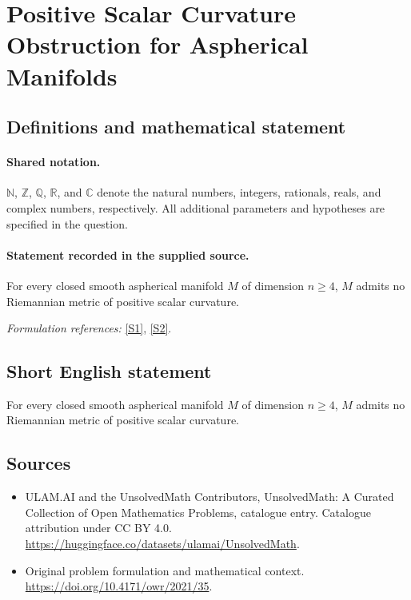 \documentclass[11pt]{article}
\newcommand{\sref}[2]{\hyperlink{source:#1:#2}{[S#2]}}
\begin{document}
\section{Positive Scalar Curvature Obstruction for Aspherical Manifolds}\label{statement}

\subsection{Definitions and mathematical statement}

\paragraph{Shared notation.}$\mathbb N$, $\mathbb Z$, $\mathbb Q$, $\mathbb R$, and $\mathbb C$ denote the natural numbers, integers, rationals, reals, and complex numbers, respectively. All additional parameters and hypotheses are specified in the question.


\paragraph{Statement recorded in the supplied source.}
For every closed smooth aspherical manifold $M$ of dimension $n\geq 4$, $M$ admits no Riemannian metric of positive scalar curvature.
\par\smallskip\textit{Formulation references:} \sref{statement}{1}, \sref{statement}{2}.
\subsection{Short English statement}
For every closed smooth aspherical manifold $M$ of dimension $n\geq 4$, $M$ admits no Riemannian metric of positive scalar curvature.
\subsection{Sources}
\begin{itemize}
\item[\hypertarget{source:statement:1}{S1}] ULAM.AI and the UnsolvedMath Contributors, UnsolvedMath: A Curated Collection of Open Mathematics Problems, catalogue entry. Catalogue attribution under CC BY 4.0.
\url{https://huggingface.co/datasets/ulamai/UnsolvedMath}.
\item[\hypertarget{source:statement:2}{S2}] Original problem formulation and mathematical context.
\url{https://doi.org/10.4171/owr/2021/35}.
\end{itemize}
\label{end:statement}
\end{document}
